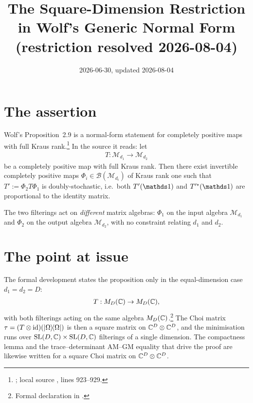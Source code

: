 \documentclass{article}
\title{The Square-Dimension Restriction in Wolf's Generic Normal Form\\
{\large (restriction resolved 2026-08-04)}}
\author{}
\date{2026-06-30, updated 2026-08-04}
\begin{document}
\maketitle
{}

\section{The assertion}

Wolf's Proposition~2.9 is a normal-form statement for completely positive maps
with full Kraus rank.\footnote{\cite[Proposition~2.9]{Wolf2012Quantum};
local source ,
lines 923--929.}  In the source it reads: let
\begin{align}
  T : \mathcal{M}_{d_1} \to \mathcal{M}_{d_2}
\end{align}
be a completely positive map with full Kraus rank.  Then there exist invertible
completely positive maps \(\Phi_i \in \mathcal B(\mathcal{M}_{d_i})\) of Kraus
rank one such that \(T' := \Phi_2 T \Phi_1\) is doubly-stochastic, i.e.\ both
\(T'(\one)\) and \(T'^{*}(\one)\) are proportional to the identity matrix.

The two filterings act on \emph{different} matrix algebras: \(\Phi_1\) on the
input algebra \(\mathcal{M}_{d_1}\) and \(\Phi_2\) on the output algebra
\(\mathcal{M}_{d_2}\), with no constraint relating \(d_1\) and \(d_2\).

\section{The point at issue}

The formal development states the proposition only in the equal-dimension case
\(d_1 = d_2 = D\):
\begin{align}
  T : M_{D}(\mathbb{C}) \to M_{D}(\mathbb{C}),
\end{align}
with both filterings acting on the same algebra \(M_{D}(\mathbb{C})\).\footnote{Formal
declaration  in
.}  The Choi matrix
\(\tau = (T \otimes \mathrm{id})(|\Omega\rangle\!\langle \Omega|)\) is then a square
matrix on \(\mathbb{C}^{D} \otimes \mathbb{C}^{D}\), and the minimisation runs over
\(\mathrm{SL}(D,\mathbb{C}) \times \mathrm{SL}(D,\mathbb{C})\) filterings of a single dimension.
The compactness lemma  and the
trace--determinant AM--GM equality
that drive the proof are likewise written for a square Choi matrix on
\(\mathbb{C}^{D} \otimes \mathbb{C}^{D}\).
\end{document}
